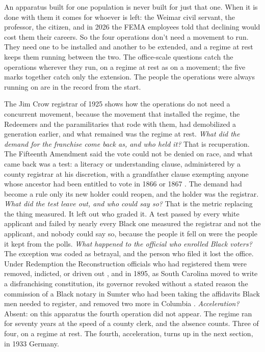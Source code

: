 An apparatus built for one population is never built for just that one. When it is done with them it comes for whoever is left: the Weimar civil servant, the professor, the citizen, and in 2026 the FEMA employees told that declining would cost them their careers. So the four operations don't need a movement to run. They need one to be installed and another to be extended, and a regime at rest keeps them running between the two. The office-scale questions catch the operations wherever they run, on a regime at rest as on a movement; the five marks together catch only the extension. The people the operations were always running on are in the record from the start.


The Jim Crow registrar of 1925 shows how the operations do not need a concurrent movement, because the movement that installed the regime, the Redeemers and the paramilitaries that rode with them, had demobilized a generation earlier, and what remained was the regime at rest. \emph{What did the demand for the franchise come back as, and who held it?} That is recuperation. The Fifteenth Amendment said the vote could not be denied on race, and what came back was a test: a literacy or understanding clause, administered by a county registrar at his discretion, with a grandfather clause exempting anyone whose ancestor had been entitled to vote in 1866 or 1867 \autocite{guinn1915,mississippi1890constitution}. The demand had become a rule only its new holder could reopen, and the holder was the registrar. \emph{What did the test leave out, and who could say so?} That is the metric replacing the thing measured. It left out who graded it. A test passed by every white applicant and failed by nearly every Black one measured the registrar and not the applicant, and nobody could say so, because the people it fell on were the people it kept from the polls. \emph{What happened to the official who enrolled Black voters?} The exception was coded as betrayal, and the person who filed it lost the office. Under Redemption the Reconstruction officials who had registered them were removed, indicted, or driven out \autocite{foner1988reconstruction}, and in 1895, as South Carolina moved to write a disfranchising constitution, its governor revoked without a stated reason the commission of a Black notary in Sumter who had been taking the affidavits Black men needed to register, and removed two more in Columbia \autocite{watchman1895muddle,watchman1895protest}. \emph{Acceleration?} Absent: on this apparatus the fourth operation did not appear. The regime ran for seventy years at the speed of a county clerk, and the absence counts. Three of four, on a regime at rest. The fourth, acceleration, turns up in the next section, in 1933 Germany.
